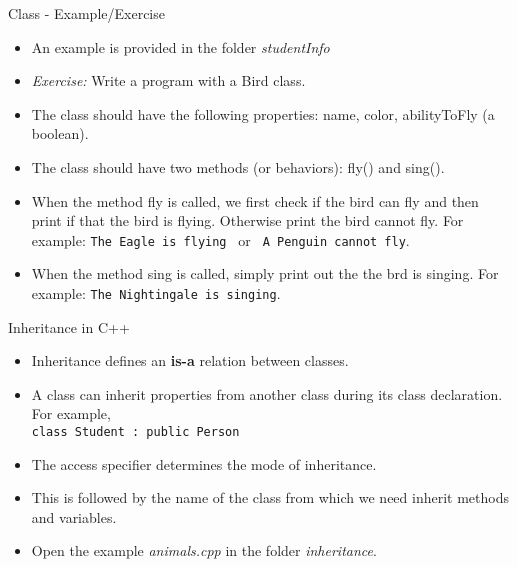 \documentclass[aspectratio=169]{beamer}
\begin{document}
\begin{frame}[fragile]{Class - Example/Exercise}
    \begin{itemize}
        \item An example is provided in the folder \textit{studentInfo}
        \item \textit{Exercise:} Write a program with a Bird class.
        \item The class should have the following properties: name, color, abilityToFly (a boolean).
        \item The class should have two methods (or behaviors): fly() and sing().
        \item When the method fly is called, we first check if the bird can fly and then print if that the bird is flying. Otherwise print the bird cannot fly. For example: \verb|The Eagle is flying | or \verb| A Penguin cannot fly|.
        \item When the method sing is called, simply print out the the brd is singing. For example: \verb|The Nightingale is singing|.
    \end{itemize}
\end{frame}

\begin{frame}[fragile]{Inheritance in C++}
    \begin{itemize}
        \item Inheritance defines an \textbf{is-a} relation between classes.
        \item A class can inherit properties from another class during its class declaration. For example,\\ \verb|class Student : public Person|
        \item The access specifier determines the mode of inheritance.
        \item This is followed by the name of the class from which we need inherit methods and variables.
        \item Open the example \textit{animals.cpp} in the folder \textit{inheritance}.
    \end{itemize}
\end{frame}
\end{document}
